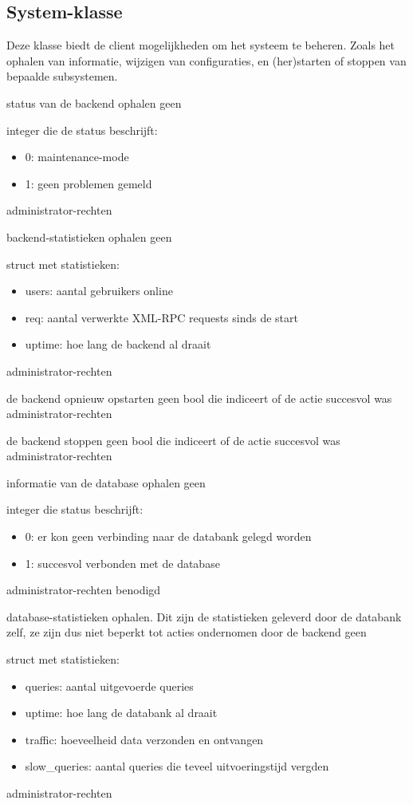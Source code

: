 \subsection{System-klasse}

Deze klasse biedt de client mogelijkheden om het systeem te beheren. Zoals het ophalen van informatie, wijzigen van configuraties, en (her)starten of stoppen van bepaalde subsystemen.

	{ status van de backend ophalen }
	{ geen }
	{ integer die de status beschrijft:
		\begin{itemize}
		\item{0: maintenance-mode}
		\item{1: geen problemen gemeld}
		\end{itemize} }
	{ administrator-rechten }

	{ backend-statistieken ophalen }
	{ geen }
	{ struct met statistieken:
		\begin{itemize}
		\item{users: aantal gebruikers online}
		\item{req: aantal verwerkte XML-RPC requests sinds de start}
		\item{uptime: hoe lang de backend al draait}
		\end{itemize} }
	{ administrator-rechten }

	{ de backend opnieuw opstarten }
	{ geen }
	{ bool die indiceert of de actie succesvol was }
	{ administrator-rechten }

	{ de backend stoppen }
	{ geen }
	{ bool die indiceert of de actie succesvol was }
	{ administrator-rechten }

	{ informatie van de database ophalen }
	{ geen }
	{ integer die status beschrijft:
		\begin{itemize}
		\item{0: er kon geen verbinding naar de databank gelegd worden}
		\item{1: succesvol verbonden met de database}
		\end{itemize} }
	{ administrator-rechten benodigd}

	{ database-statistieken ophalen. Dit zijn de statistieken geleverd door de databank zelf, ze zijn dus niet beperkt tot acties ondernomen door de backend }
	{ geen }
	{ struct met statistieken:
		\begin{itemize}
		\item{queries: aantal uitgevoerde queries}
		\item{uptime: hoe lang de databank al draait}
		\item{traffic: hoeveelheid data verzonden en ontvangen}
		\item{slow\_queries: aantal queries die teveel uitvoeringstijd vergden}
		\end{itemize} }
	{ administrator-rechten }

